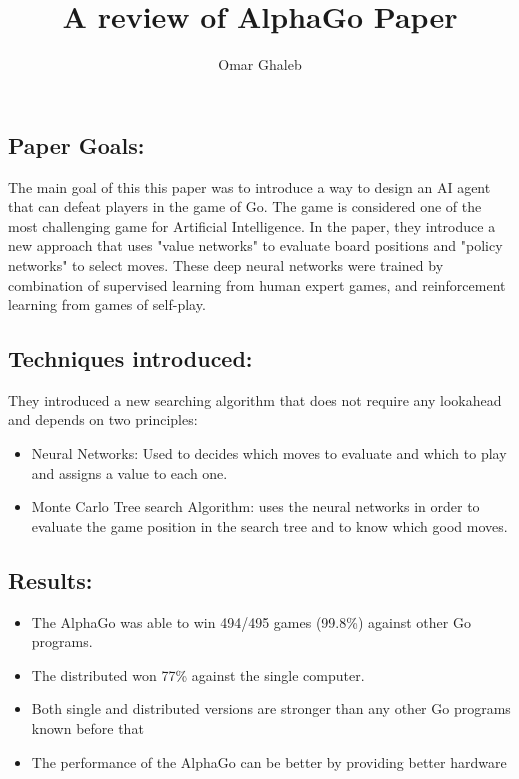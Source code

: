 \documentclass[11pt]{article}
\begin{document}
\title{A review of AlphaGo Paper}
\author{Omar Ghaleb}
\date{}
\maketitle
\subsection*{Paper Goals:}
The main goal of this this paper was to introduce a way to design an AI agent that can defeat players in the game of Go. The game is considered one of the most challenging game for Artificial Intelligence. In the paper, they introduce a new approach that uses "value networks" to evaluate board positions and "policy networks" to select moves. These deep neural networks were trained by combination of supervised learning from human expert games, and reinforcement learning from games of self-play.

\subsection*{Techniques introduced:}
They introduced a new searching algorithm that does not require any lookahead and depends on two principles:
\begin{itemize}
  \item Neural Networks: Used to decides which moves to evaluate and which to play and assigns a value to each one.
  \item Monte Carlo Tree search Algorithm: uses the neural networks in order to evaluate the game position in the search tree and to know which good moves.
\end{itemize}

\subsection*{Results:}
\begin{itemize}
  \item The AlphaGo was able to win 494/495 games (99.8\%) against other Go programs.
  \item The distributed won 77\% against the single computer.
  \item Both single and distributed versions are stronger than any other Go programs known before that
  \item The performance of the AlphaGo can be better by providing better hardware 
\end{itemize}
\end{document}
